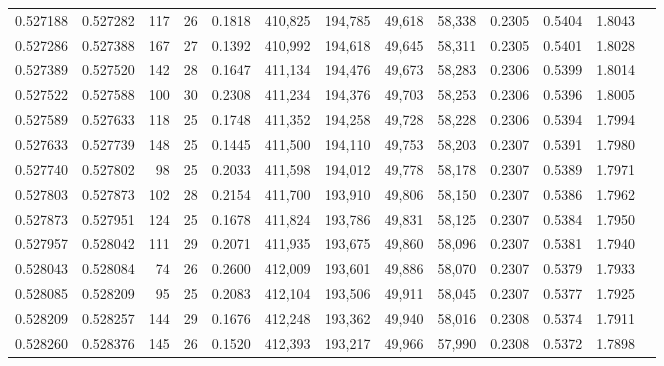 \begin{tabular}{rrrrrrrrrrrrr}
0.527188 & 0.527282 & 117 &  26 &                                     0.1818 & 410,825 & 194,785 &  49,618 &  58,338 & 0.2305 & 0.5404 & 1.8043 \\
0.527286 & 0.527388 & 167 &  27 &                                     0.1392 & 410,992 & 194,618 &  49,645 &  58,311 & 0.2305 & 0.5401 & 1.8028 \\
0.527389 & 0.527520 & 142 &  28 &                                     0.1647 & 411,134 & 194,476 &  49,673 &  58,283 & 0.2306 & 0.5399 & 1.8014 \\
0.527522 & 0.527588 & 100 &  30 &                                     0.2308 & 411,234 & 194,376 &  49,703 &  58,253 & 0.2306 & 0.5396 & 1.8005 \\
0.527589 & 0.527633 & 118 &  25 &                                     0.1748 & 411,352 & 194,258 &  49,728 &  58,228 & 0.2306 & 0.5394 & 1.7994 \\
0.527633 & 0.527739 & 148 &  25 &                                     0.1445 & 411,500 & 194,110 &  49,753 &  58,203 & 0.2307 & 0.5391 & 1.7980 \\
0.527740 & 0.527802 &  98 &  25 &                                     0.2033 & 411,598 & 194,012 &  49,778 &  58,178 & 0.2307 & 0.5389 & 1.7971 \\
0.527803 & 0.527873 & 102 &  28 &                                     0.2154 & 411,700 & 193,910 &  49,806 &  58,150 & 0.2307 & 0.5386 & 1.7962 \\
0.527873 & 0.527951 & 124 &  25 &                                     0.1678 & 411,824 & 193,786 &  49,831 &  58,125 & 0.2307 & 0.5384 & 1.7950 \\
0.527957 & 0.528042 & 111 &  29 &                                     0.2071 & 411,935 & 193,675 &  49,860 &  58,096 & 0.2307 & 0.5381 & 1.7940 \\
0.528043 & 0.528084 &  74 &  26 &                                     0.2600 & 412,009 & 193,601 &  49,886 &  58,070 & 0.2307 & 0.5379 & 1.7933 \\
0.528085 & 0.528209 &  95 &  25 &                                     0.2083 & 412,104 & 193,506 &  49,911 &  58,045 & 0.2307 & 0.5377 & 1.7925 \\
0.528209 & 0.528257 & 144 &  29 &                                     0.1676 & 412,248 & 193,362 &  49,940 &  58,016 & 0.2308 & 0.5374 & 1.7911 \\
0.528260 & 0.528376 & 145 &  26 &                                     0.1520 & 412,393 & 193,217 &  49,966 &  57,990 & 0.2308 & 0.5372 & 1.7898 \\

\end{tabular}
